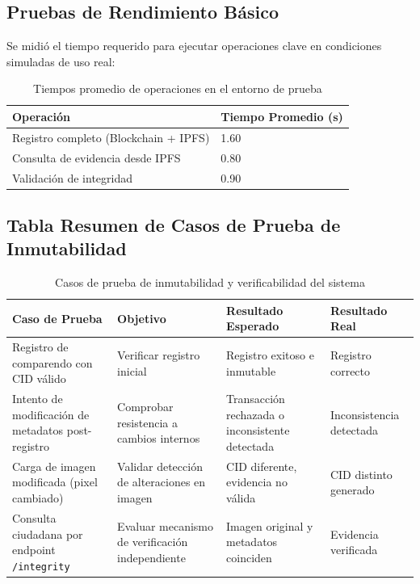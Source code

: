 \documentclass[
    letterpaper, 
    man,   
    spanish,
    12pt,
    donotrepeattitle,
    floatsintext,
    hidelinks %
]{apa7}
\begin{document}
\subsection{Pruebas de Rendimiento Básico}

Se midió el tiempo requerido para ejecutar operaciones clave en condiciones simuladas de uso real:

\begin{table}[htbp]
\centering
\begin{tabular}{|p{4cm}|p{3cm}|}
\hline
\textbf{Operación} & \textbf{Tiempo Promedio (s)} \\
\hline
Registro completo (Blockchain + IPFS) & 1.60 \\
\hline
Consulta de evidencia desde IPFS & 0.80 \\
\hline
Validación de integridad & 0.90 \\
\hline
\end{tabular}
\caption{Tiempos promedio de operaciones en el entorno de prueba}
\end{table}

\subsection{Tabla Resumen de Casos de Prueba de Inmutabilidad}

\begin{table}[htbp]
\centering
\begin{tabular}{|p{4cm}|p{3cm}|p{3cm}|p{3cm}|}
\hline
\textbf{Caso de Prueba} & \textbf{Objetivo} & \textbf{Resultado Esperado} & \textbf{Resultado Real} \\
\hline
Registro de comparendo con CID válido & Verificar registro inicial & Registro exitoso e inmutable & Registro correcto \\
\hline
Intento de modificación de metadatos post-registro & Comprobar resistencia a cambios internos & Transacción rechazada o inconsistente detectada & Inconsistencia detectada \\
\hline
Carga de imagen modificada (pixel cambiado) & Validar detección de alteraciones en imagen & CID diferente, evidencia no válida & CID distinto generado \\
\hline
Consulta ciudadana por endpoint \texttt{/integrity} & Evaluar mecanismo de verificación independiente & Imagen original y metadatos coinciden & Evidencia verificada \\
\hline
\end{tabular}
\caption{Casos de prueba de inmutabilidad y verificabilidad del sistema}
\end{table}
\end{document}
